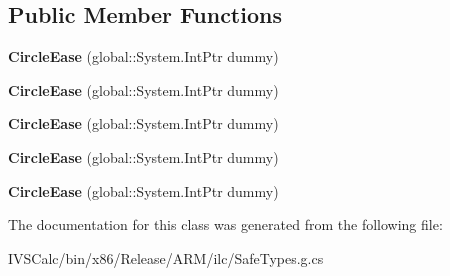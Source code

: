 \subsection*{Public Member Functions}
\begin{DoxyCompactItemize}
\item 
\mbox{\label{class_windows_1_1_u_i_1_1_xaml_1_1_media_1_1_animation_1_1_circle_ease_acf675f0cfd24eedcc9deac7f8ff36319}} 
{\bfseries Circle\+Ease} (global\+::\+System.\+Int\+Ptr dummy)
\item 
\mbox{\label{class_windows_1_1_u_i_1_1_xaml_1_1_media_1_1_animation_1_1_circle_ease_acf675f0cfd24eedcc9deac7f8ff36319}} 
{\bfseries Circle\+Ease} (global\+::\+System.\+Int\+Ptr dummy)
\item 
\mbox{\label{class_windows_1_1_u_i_1_1_xaml_1_1_media_1_1_animation_1_1_circle_ease_acf675f0cfd24eedcc9deac7f8ff36319}} 
{\bfseries Circle\+Ease} (global\+::\+System.\+Int\+Ptr dummy)
\item 
\mbox{\label{class_windows_1_1_u_i_1_1_xaml_1_1_media_1_1_animation_1_1_circle_ease_acf675f0cfd24eedcc9deac7f8ff36319}} 
{\bfseries Circle\+Ease} (global\+::\+System.\+Int\+Ptr dummy)
\item 
\mbox{\label{class_windows_1_1_u_i_1_1_xaml_1_1_media_1_1_animation_1_1_circle_ease_acf675f0cfd24eedcc9deac7f8ff36319}} 
{\bfseries Circle\+Ease} (global\+::\+System.\+Int\+Ptr dummy)
\end{DoxyCompactItemize}


The documentation for this class was generated from the following file\+:\begin{DoxyCompactItemize}
\item 
I\+V\+S\+Calc/bin/x86/\+Release/\+A\+R\+M/ilc/Safe\+Types.\+g.\+cs\end{DoxyCompactItemize}
